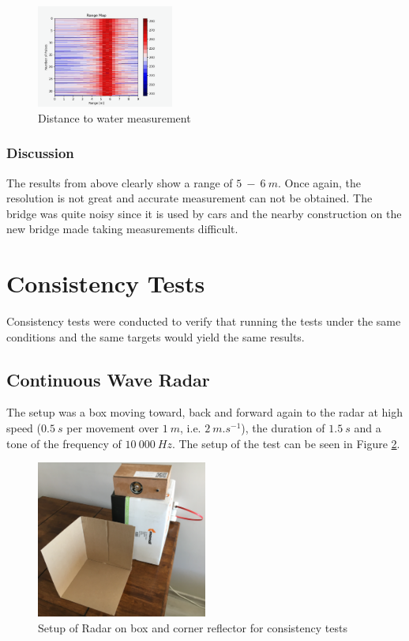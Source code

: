 \begin{figure}[h!]
    \centering
    \includegraphics[width = 0.4\textwidth]{images/setupPDTest2Results.pdf}
    \caption{Distance to water measurement}\label{fig:setupPDTest2Results}
\end{figure}

\subsubsection{Discussion}

The results from above clearly show a range of $5\ -\ 6\ m$. Once again, the resolution is not great and accurate measurement can not be obtained. The bridge was quite noisy since it is used by cars and the nearby construction on the new bridge made taking measurements difficult.

\section{Consistency Tests}
Consistency tests were conducted to verify that running the tests under the same conditions and the same targets would yield the same results. 

\subsection{Continuous Wave Radar}
The setup was a box moving toward, back and forward again to the radar at high speed ($0.5\ s$ per movement over $1\ m$, i.e. $2\ m.s^{-1}$), the duration of $1.5\ s$ and a tone of the frequency of $10\ 000\ Hz$. The setup of the test can be seen in Figure \ref{fig:setupCWresults}.

\begin{figure}[h!]
    \centering
    \includegraphics[width = 0.5\textwidth]{images/setupCWConsisresults.pdf}
    \caption{Setup of Radar on box and corner reflector for consistency tests}\label{fig:setupCWresults}
\end{figure}

